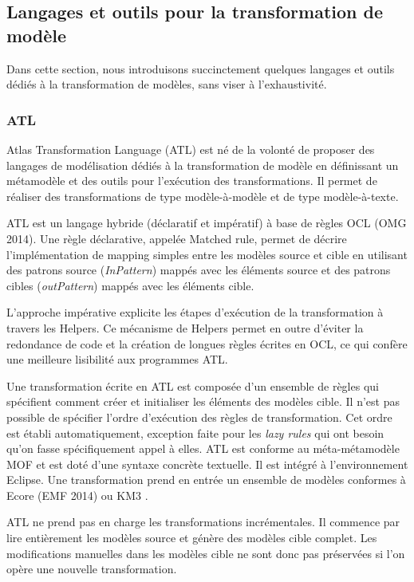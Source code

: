 \subsection{Langages et outils pour la transformation de modèle}
Dans cette section, nous introduisons succinctement quelques langages et outils dédiés à la transformation de modèles, sans viser à l'exhaustivité.

\subsubsection{ATL}
\label{sec:ATL}
Atlas Transformation Language (ATL) \cite{jouault2006transforming} \cite{jouault2008atl} est né de la volonté de proposer des langages de modélisation dédiés à la transformation de modèle en définissant un métamodèle et des outils pour l'exécution des transformations. Il permet de réaliser des transformations de type modèle-à-modèle et de type modèle-à-texte.

ATL  est un langage hybride (déclaratif et impératif) à base de règles OCL (OMG 2014). Une règle déclarative, appelée Matched rule, permet de décrire l'implémentation de mapping simples entre les modèles source et cible en utilisant des patrons source (\textit{InPattern}) mappés avec les éléments source et des patrons cibles (\textit{outPattern}) mappés avec les éléments cible. 

L'approche impérative explicite les étapes d'exécution de la transformation à travers les Helpers. Ce mécanisme de Helpers permet en outre d'éviter la redondance de code et la création de longues règles écrites en OCL, ce qui confère une meilleure lisibilité aux programmes ATL. 

Une transformation écrite en ATL est composée d'un ensemble de règles qui spécifient comment créer et initialiser les éléments des modèles cible. Il n'est pas possible de spécifier l'ordre d'exécution des règles de transformation. Cet ordre est établi automatiquement, exception faite pour les \textit{lazy rules} qui ont besoin qu'on fasse spécifiquement appel à elles. ATL est conforme au méta-métamodèle MOF et est doté d'une syntaxe concrète textuelle. Il est intégré à l'environnement Eclipse. Une transformation prend en entrée un ensemble de modèles conformes à Ecore (EMF 2014) ou KM3 \cite{jouault2006km3}.

ATL ne prend pas en charge les transformations incrémentales. Il commence par lire entièrement les modèles source et génère des modèles cible complet. Les modifications manuelles dans les modèles cible ne sont donc pas préservées si l'on opère une nouvelle transformation.

